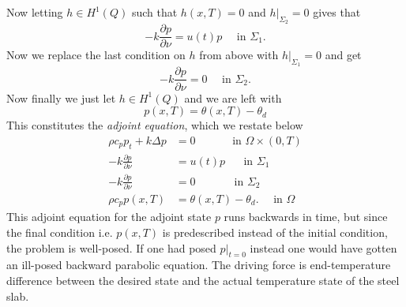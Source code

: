Now letting $h\in H^1(Q)$ such that $h(x, T) = 0$ and $h|_{\Sigma_2}=0$ gives that
\begin{equation*}
  -k\frac{\partial p}{\partial\nu} = u(t)p \quad\textrm{ in } \Sigma_1.
\end{equation*}
Now we replace the last condition on $h$ from above with $h|_{\Sigma_1}=0$ and get
\begin{equation*}
  -k\frac{\partial p}{\partial\nu} = 0 \quad\textrm{ in } \Sigma_2.
\end{equation*}
Now finally we just let $h\in H^1(Q)$ and we are left with
\begin{equation*}
  p(x, T) = \theta(x, T) - \theta_d
\end{equation*}
This constitutes the \textit{adjoint equation}, which we restate below
\begin{subequations}
   \begin{align} %
      \rho c_p p_t + k\Delta p &= 0 \quad\qquad\textrm{ in } \Omega \times (0,T) \\
      {-k}\frac{\partial p}{\partial\nu} &= u(t)p \,\,\quad\textrm{ in } \Sigma_1 \\
      {-k}\frac{\partial p}{\partial\nu} &= 0 \,\quad\qquad\textrm{ in } \Sigma_2 \\
      \rho c_p p(x, T) &= \theta(x, T) - \theta_d. \quad \textrm{ in } \Omega
   \end{align}
   \label{eq:adjoint-eqn}
\end{subequations}
This adjoint equation for the adjoint state $p$ runs backwards in time, but since the final condition i.e. $p(x,T)$ is predescribed instead of the initial condition, the problem is well-posed. If one had posed $p|_{t=0}$ instead one would have gotten an ill-posed backward parabolic equation. The driving force is end-temperature difference between the desired state and the actual temperature state of the steel slab.

